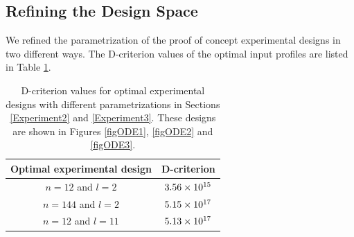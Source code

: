 \subsection{Refining the Design Space}
We refined the parametrization of the proof of concept experimental designs in two different ways. The D-criterion values of the optimal input profiles are listed in Table \ref{table2}.
\label{Refinement}
\begin{table}
	\centering
	\begin{tabular}{|c|c|}
		\hline 
		Optimal experimental design & D-criterion \\ 
		\hline 
		$n = 12$ and $l = 2$& $3.56\times 10^{15}$  \\ 
		
		$n = 144$ and $l = 2$& {\color{red}$5.15\times 10^{17}$ }\\ 
		
		$n = 12$ and $l= 11$& {\color{red}$5.13\times 10^{17}$} \\ 
		\hline
	\end{tabular} 
	\caption{D-criterion values for optimal experimental designs with different parametrizations  in Sections \ref{Experiment2} and \ref{Experiment3}. {\color{red}These designs are shown in Figures \ref{figODE1}, \ref{figODE2} and \ref{figODE3}.}} 
	\label{table2}
\end{table}

